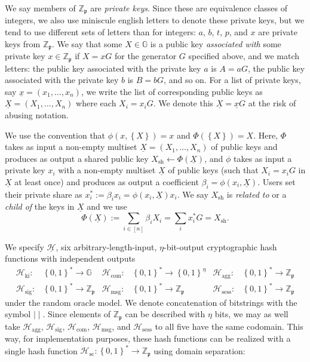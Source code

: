 \documentclass{mrl}
\theoremstyle{definition}
\numberwithin{theorem}{subsection}
\newcommand{\scalarField}{\mathbb{Z}_{\mathfrak{p}}}
\newcommand{\group}{\mathbb{G}}
\begin{document}
We say members of $\scalarField$ are \textit{private keys}. Since these are equivalence classes of integers, we also use miniscule english letters to denote these private keys, but we tend to use different sets of letters than for integers: $a$, $b$, $t$, $p$, and $x$ are private keys from $\scalarField$. We say that some $X \in \group$ is a public key \textit{associated with} some private key $x \in \scalarField$ if $X = xG$ for the generator $G$ specified above, and we match letters: the public key associated with the private key $a$ is $A = aG$, the public key associated with the private key $b$ is $B = bG$, and so on. For a list of private keys, say $\underline{x} =  (x_1, \ldots, x_n)$, we write the list of corresponding public keys as $\underline{X} = (X_1, \ldots, X_n)$ where each $X_i = x_i G$. We denote this $\underline{X} = \underline{x}G$ at the risk of abusing notation. 

We use the convention that $\phi(x, \left\{X\right\}) = x$ and $\Phi(\left\{X\right\}) = X$. Here, $\Phi$ takes as input a non-empty multiset $\underline{X} = (X_1, \ldots, X_n)$ of public keys and produces as output a shared public key $X_{\text{sh}} \leftarrow \Phi(\underline{X})$, and $\phi$ takes as input a private key $x_i$ with a non-empty multiset $\underline{X}$ of public keys (such that $X_i = x_iG$ in $\underline{X}$ at least once) and produces as output a coefficient $\beta_i = \phi(x_i, \underline{X})$. Users set their private share as $x_i^* := \beta_i x_i = \phi(x_i, \underline{X}) x_i$. We say $X_{\text{sh}}$ is \textit{related to} or a \textit{child of} the keys in $\underline{X}$ and we use \[\Phi(\underline{X}) := \sum_{i \in [n]} \beta_i X_i = \sum_i x_i^* G = X_{\text{sh}}.\]

We specify $\underline{\mathcal{H}}$, six arbitrary-length-input, $\eta$-bit-output cryptographic hash functions with independent outputs
\begin{align*}
\mathcal{H}_{\text{ki}}:& \left\{0,1\right\}^* \to \group & \mathcal{H}_{\text{com}}:& \left\{0,1\right\}^* \to \left\{0,1\right\}^\eta & \mathcal{H}_{\text{agg}}:&  \left\{0,1\right\}^* \to \scalarField \\ \mathcal{H}_{\text{sig}}:& \left\{0,1\right\}^* \to \scalarField &
\mathcal{H}_{\text{msg}}:& \left\{0,1\right\}^* \to \scalarField &
\mathcal{H}_{\text{sess}}:& \left\{0,1\right\}^* \to \scalarField
\end{align*} under the random oracle model. We denote concatenation of bitstrings with the symbol $\mid \mid$. Since elements of $\scalarField$ can be described with $\eta$ bits, we may as well take $\mathcal{H}_{\text{agg}}$, $\mathcal{H}_{\text{sig}}$, $\mathcal{H}_{\text{com}}$, $\mathcal{H}_{\text{msg}}$, and $\mathcal{H}_{\text{sess}}$ to all five have the same codomain. This way, for implementation purposes, these hash functions can be realized with a single hash function $\mathcal{H}_{\text{sc}}:\left\{0,1\right\}^* \to \scalarField$ using domain separation:
\end{document}
